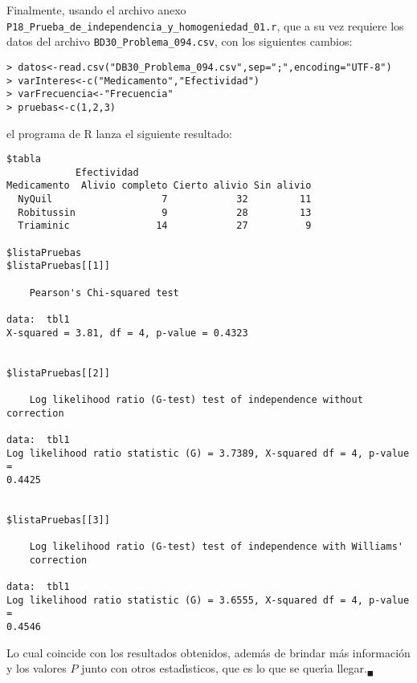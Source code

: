 \begin{solucion}
 Finalmente, usando el archivo anexo
 \texttt{P18\_Prueba\_de\_independencia\_y\_homogeniedad\_01.r},
 que a su vez requiere los datos del archivo
 \texttt{BD30\_Problema\_094.csv}, con los siguientes cambios:
 \begin{verbatim}
> datos<-read.csv("DB30_Problema_094.csv",sep=";",encoding="UTF-8")
> varInteres<-c("Medicamento","Efectividad")
> varFrecuencia<-"Frecuencia"
> pruebas<-c(1,2,3)
 \end{verbatim}
 \vspace{-0.5cm}
 el programa de R lanza el siguiente resultado:
 \begin{verbatim}
$tabla
            Efectividad
Medicamento  Alivio completo Cierto alivio Sin alivio
  NyQuil                   7            32         11
  Robitussin               9            28         13
  Triaminic               14            27          9

$listaPruebas
$listaPruebas[[1]]

	Pearson's Chi-squared test

data:  tbl1
X-squared = 3.81, df = 4, p-value = 0.4323


$listaPruebas[[2]]

	Log likelihood ratio (G-test) test of independence without correction

data:  tbl1
Log likelihood ratio statistic (G) = 3.7389, X-squared df = 4, p-value =
0.4425


$listaPruebas[[3]]

	Log likelihood ratio (G-test) test of independence with Williams'
	correction

data:  tbl1
Log likelihood ratio statistic (G) = 3.6555, X-squared df = 4, p-value =
0.4546
 \end{verbatim}
 \vspace{-0.5cm}
 Lo cual coincide con los resultados obtenidos, adem\'as de brindar m\'as
 informaci\'on y los valores $P$ junto con otros estad\'{\i}sticos,
 que es lo que se quer\'{\i}a llegar.${}_{\blacksquare}$
\end{solucion}
